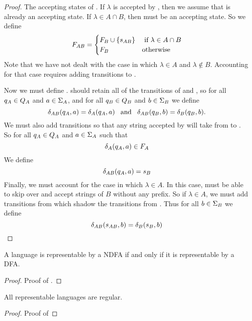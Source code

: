 \documentclass{bcthesis}
\begin{document}
\begin{proof}
		The accepting states of \mab.
		If $\lambda$ is accepted by \mb, then we assume that \sb is already an accepting state.
		If $\lambda \in A \cap B$, then \sab must be an accepting state.
		So we define
		\[
			F_{AB} = 	\begin{cases}
						F_B \cup \{ s_{AB} \} &\text{ if } \lambda \in A \cap B \\
						F_B &\text{otherwise}
					\end{cases}
		\]
		Note that we have not dealt with the case in which $\lambda \in A$ and $\lambda \notin B$.
		Accounting for that case requires adding transitions to \mab.

		Now we must define \dalab.
		\mab should retain all of the transitions of \ma and \mb, so for all $q_A \in Q_A$ and $a \in \Sigma_A$, and for all $q_B \in Q_B$ and $b \in \Sigma_B$ we define
		\[
			\delta_{AB}(q_A, a) = \delta_A(q_A, a) \enspace \text{ and } \enspace \delta_{AB}(q_B, b) = \delta_B(q_B, b).
		\]
		We must also add transitions so that any string accepted by \ma will take \mab from \sab to \sb.
		So for all $q_A \in Q_A$ and $a \in \Sigma_A$ such that 
		\[
			\delta_A(q_A, a) \in F_A
		\]
		We define
		\[
			\delta_{AB}(q_A, a) = s_B
		\]
		Finally, we must account for the case in which $\lambda \in A$.
		In this case, \mab must be able to skip over \ma and accept strings of $B$ without any prefix.
		So if $\lambda \in A$, we must add transitions from \sab which shadow the transitions from \sb.
		Thus for all $b \in \Sigma_B$ we define
		\[
			\delta_{AB}(s_{AB}, b) = \delta_B(s_B, b)
		\]
		



	\end{proof}

	\begin{claim}
	\label{prop:ndfa_dfa_equivalent}
		A language is representable by a NDFA if and only if it is representable by a DFA.
	\end{claim}

	\begin{proof}
	\label{proof:ndfa_dfa_equivalent}
		Proof of .
	\end{proof}

	\begin{claim}
	\label{prop:representable_languages_regular}
		All representable languages are regular.
	\end{claim}

	\begin{proof}
		Proof of 
	\end{proof}
	
\end{document}
